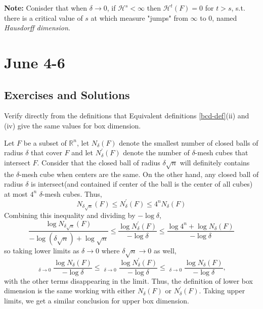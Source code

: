 \documentclass[12pt, a4paper]{article}
\DeclareMathOperator*\lowlim{\underline{lim}}
\begin{document}
\textbf{Note: }Conisder that when $\delta\rightarrow 0$, if $\mathcal{H}^s<\infty$ then $\mathcal{H}^t(F) = 0$ for $t>s$, s.t. there is a critical value of $s$ at which measure "jumps" from $\infty$ to $0$, named \textit{Hausdorff dimension}.


\newpage
\section{June 4-6}
\subsection{Exercises and Solutions}

\begin{customexercise}{2.1}
    Verify directly from the definitions that Equivalent definitions \ref{bcd-def}(ii) and (iv) give the same values for box dimension.
\end{customexercise}

\begin{customsol}{2.1}
    Let $F$ be a subset of $\mathbb{R}^{n}$, let $N_{\delta}(F)$ denote the smallest number of closed balls of radius $\delta$ that cover $F$ and let $N_{\delta}^{\prime}(F)$ denote the number of $\delta$-mesh cubes that intersect $F$. 
    Consider that the closed ball of radius $\delta\sqrt{n}$ will definitely contains the $\delta$-mesh cube when centers are the same. On the other hand, any closed ball of radius $\delta$ is intersect(and contained if center of the ball is the center of all cubes) at most $4^n$ $\delta$-mesh cubes. Thus, 
    $$
    N_{\delta \sqrt{n}}(F) \leq N_{\delta}^{\prime}(F) \leq 4^{n} N_{\delta}(F)
    $$
    Combining this inequality and dividing by $-\log \delta$,
$$
\frac{\log N_{\delta \sqrt{n}}(F)}{-\log (\delta \sqrt{n})+\log \sqrt{n}} \leq \frac{\log N_{\delta}^{\prime}(F)}{-\log \delta} \leq \frac{\log 4^{n}+\log N_{\delta}(F)}{-\log \delta}
$$
so taking lower limits as $\delta \rightarrow 0$ where $\delta\sqrt{n}\rightarrow 0 $ as well,
$$
\lowlim _{\delta \rightarrow 0} \frac{\log N_{\delta}(F)}{-\log \delta} \leq \lowlim _{\delta \rightarrow 0} \frac{\log N_{\delta}^{\prime}(F)}{-\log \delta} \leq \lowlim _{\delta \rightarrow 0} \frac{\log N_{\delta}(F)}{-\log \delta},
$$
with the other terms disappearing in the limit. Thus, the definition of lower box dimension is the same working with either $N_{\delta}(F)$ or $N_{\delta}^{\prime}(F)$. Taking upper limits, we get a similar conclusion for upper box dimension.
\end{customsol}
\end{document}
